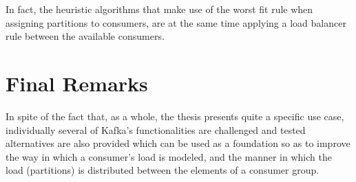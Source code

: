 In fact, the heuristic algorithms that make use of the worst fit rule when
assigning partitions to consumers, are at the same time applying a load balancer
rule between the available consumers.

\section{Final Remarks}

In spite of the fact that, as a whole, the thesis presents quite a specific use
case, individually several of Kafka's functionalities are challenged and tested
alternatives are also provided which can be used as a foundation so as to
improve the way in which a consumer's load is modeled, and the manner in which
the load (partitions) is distributed between the elements of a consumer group.
